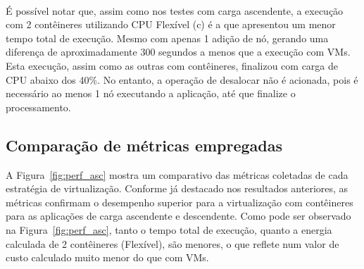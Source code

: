 \documentclass[twoside,english,brazilian]{UNISINOSartigo}
\begin{document}
\begin{figure}[ht!]
\vspace{-0.4\baselineskip}
\\

\label{fig:trend_des}
\end{figure}

É possível notar que, assim como nos testes com carga ascendente, a execução com 2 contêineres utilizando CPU Flexível (c) é a que apresentou um menor tempo total de execução. Mesmo com apenas 1 adição de nó, gerando uma diferença de aproximadamente 300 segundos a menos que a execução com VMs. Esta execução, assim como as outras com contêineres, finalizou com carga de CPU abaixo dos 40\%. No entanto, a operação de desalocar não é acionada, pois é necessário ao menos 1 nó executando a aplicação, até que finalize o processamento.


\subsection{Comparação de métricas empregadas}
\label{comp_metricas}

A Figura~\ref{fig:perf_asc} mostra um comparativo das métricas coletadas de cada estratégia de virtualização. Conforme já destacado nos resultados anteriores, as métricas confirmam o desempenho superior para a virtualização com contêineres para as aplicações de carga ascendente e descendente. Como pode ser observado na Figura~\ref{fig:perf_asc},  tanto o tempo total de execução, quanto a energia calculada de 2 contêineres (Flexível), são menores, o que reflete num valor de custo calculado muito menor do que com VMs. 
\end{document}
